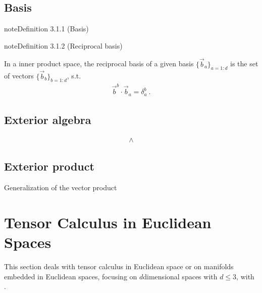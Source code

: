 \documentclass[letterpaper,10pt,english]{jupyterBook}
\begin{document}
\section{Basis}
\label{\detokenize{ch/tensor-algebra-calculus/algebra:basis}}\label{ch/tensor-algebra-calculus/algebra:definition-0}
\begin{sphinxadmonition}{note}{Definition 3.1.1 (Basis)}


\end{sphinxadmonition}
\label{ch/tensor-algebra-calculus/algebra:definition-1}
\begin{sphinxadmonition}{note}{Definition 3.1.2 (Reciprocal basis)}



\sphinxAtStartPar
In a inner product space, the reciprocal basis of a given basis \(\{ \vec{b}_a \}_{a=1:d}\) is the set of vectors \(\{ \vec{b}_{b} \}_{b=1:d}\), s.t.
\begin{equation*}
\begin{split}\vec{b}^b \cdot \vec{b}_a = \delta_a^b \ .\end{split}
\end{equation*}\end{sphinxadmonition}


\section{Exterior algebra}
\label{\detokenize{ch/tensor-algebra-calculus/algebra:exterior-algebra}}\begin{equation*}
\begin{split}\land\end{split}
\end{equation*}

\section{Exterior product}
\label{\detokenize{ch/tensor-algebra-calculus/algebra:exterior-product}}
\sphinxAtStartPar
Generalization of the vector product

\sphinxstepscope


\chapter{Tensor Calculus in Euclidean Spaces}
\label{\detokenize{ch/tensor-algebra-calculus/calculus-euclidean:tensor-calculus-in-euclidean-spaces}}\label{\detokenize{ch/tensor-algebra-calculus/calculus-euclidean:tensor-calculus}}\label{\detokenize{ch/tensor-algebra-calculus/calculus-euclidean::doc}}
\sphinxAtStartPar
This section deals with tensor calculus in Euclidean space or on manifolds embedded in Euclidean spaces, focusing on \(d\)\sphinxhyphen{}dimensional spaces with \(d \le 3\), with .
\end{document}

